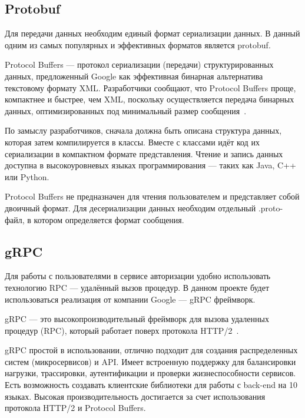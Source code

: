 \subsection{Protobuf}

Для передачи данных необходим единый формат сериализации данных. В данный одним из самых популярных и эффективных форматов является protobuf.

Protocol Buffers — протокол сериализации (передачи) структурированных данных, предложенный Google как эффективная бинарная альтернатива текстовому формату XML. Разработчики сообщают, что Protocol Buffers проще, компактнее и быстрее, чем XML, поскольку осуществляется передача бинарных данных, оптимизированных под минимальный размер сообщения~\cite{protobuf}.

По замыслу разработчиков, сначала должна быть описана структура данных, которая затем компилируется в классы. Вместе с классами идёт код их сериализации в компактном формате представления. Чтение и запись данных доступна в высокоуровневых языках программирования — таких как Java, C++ или Python.

Protocol Buffers не предназначен для чтения пользователем и представляет собой двоичный формат. Для десериализации данных необходим отдельный .proto-файл, в котором определяется формат сообщения.



\subsection{gRPC}

Для работы с пользователями в сервисе авторизации удобно использовать технологию RPC — удалённый вызов процедур. В данном проекте будет использоваться реализация от компании Google — gRPC фреймворк.

gRPC — это высокопроизводительный фреймворк для вызова удаленных процедур (RPC), который работает поверх протокола HTTP/2~\cite{grpc}.

gRPC простой в использовании, отлично подходит для создания распределенных систем (микросервисов) и API. Имеет встроенную поддержку для балансировки нагрузки, трассировки, аутентификации и проверки жизнеспособности сервисов. Есть возможность создавать клиентские библиотеки для работы с back-end на 10 языках. Высокая производительность достигается за счет использования протокола HTTP/2 и Protocol Buffers.

